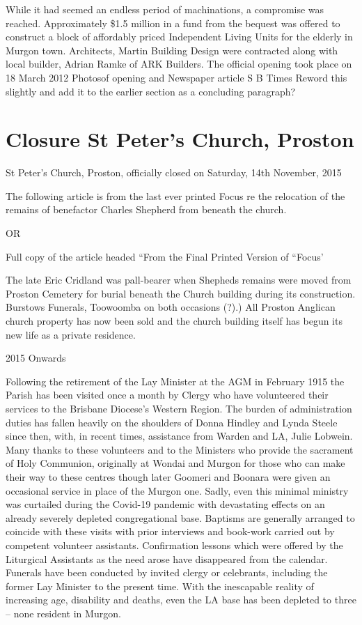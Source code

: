 While it had seemed an endless period of machinations, a compromise was reached. Approximately \$1.5 million in a fund from the bequest was offered to construct a block of affordably priced Independent Living Units for the elderly in Murgon town. Architects, Martin Building Design were contracted along with local builder, Adrian Ramke of ARK Builders. The official opening took place on 18 March 2012 Photosof opening and Newspaper article S B Times Reword this slightly and add it to the earlier section as a concluding paragraph?

\hypertarget{closure-st-peters-church-proston}{%
\section{Closure St Peter's Church, Proston}\label{closure-st-peters-church-proston}}

St Peter's Church, Proston, officially closed on Saturday, 14th November, 2015

The following article is from the last ever printed Focus re the relocation of the remains of benefactor Charles Shepherd from beneath the church.

OR

Full copy of the article headed ``From the Final Printed Version of ``Focus'

The late Eric Cridland was pall-bearer when Shepheds remains were moved from Proston Cemetery for burial beneath the Church building during its construction. Burstows Funerals, Toowoomba on both occasions (?).) All Proston Anglican church property has now been sold and the church building itself has begun its new life as a private residence.

2015 Onwards

Following the retirement of the Lay Minister at the AGM in February 1915 the Parish has been visited once a month by Clergy who have volunteered their services to the Brisbane Diocese's Western Region. The burden of administration duties has fallen heavily on the shoulders of Donna Hindley and Lynda Steele since then, with, in recent times, assistance from Warden and LA, Julie Lobwein. Many thanks to these volunteers and to the Ministers who provide the sacrament of Holy Communion, originally at Wondai and Murgon for those who can make their way to these centres though later Goomeri and Boonara were given an occasional service in place of the Murgon one. Sadly, even this minimal ministry was curtailed during the Covid-19 pandemic with devastating effects on an already severely depleted congregational base. Baptisms are generally arranged to coincide with these visits with prior interviews and book-work carried out by competent volunteer assistants. Confirmation lessons which were offered by the Liturgical Assistants as the need arose have disappeared from the calendar. Funerals have been conducted by invited clergy or celebrants, including the former Lay Minister to the present time. With the inescapable reality of increasing age, disability and deaths, even the LA base has been depleted to three -- none resident in Murgon.

